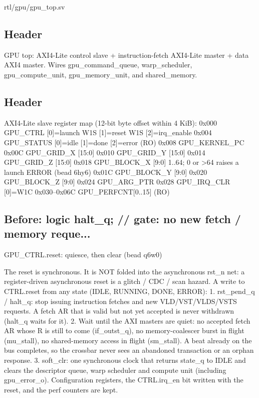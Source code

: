 \begin{relocated}{rtl/gpu/gpu_top.sv}

\subsection*{Header}

\begin{textblock}
GPU top: AXI4-Lite control slave + instruction-fetch AXI4-Lite master +
data AXI4 master.  Wires gpu_command_queue, warp_scheduler,
gpu_compute_unit, gpu_memory_unit, and shared_memory.
\end{textblock}

\subsection*{Header}

\begin{textblock}
AXI4-Lite slave register map (12-bit byte offset within 4 KiB):
  0x000 GPU_CTRL      [0]=launch W1S  [1]=reset W1S  [2]=irq_enable
  0x004 GPU_STATUS    [0]=idle [1]=done [2]=error  (RO)
  0x008 GPU_KERNEL_PC
  0x00C GPU_GRID_X    [15:0]
  0x010 GPU_GRID_Y    [15:0]
  0x014 GPU_GRID_Z    [15:0]
  0x018 GPU_BLOCK_X   [9:0]   1..64; 0 or >64 raises a launch ERROR (bead 6hy6)
  0x01C GPU_BLOCK_Y   [9:0]
  0x020 GPU_BLOCK_Z   [9:0]
  0x024 GPU_ARG_PTR
  0x028 GPU_IRQ_CLR   [0]=W1C
  0x030–0x06C GPU_PERFCNT[0..15]  (RO)
\end{textblock}

\subsection*{Before: logic halt\_q;       // gate: no new fetch / memory reque...}

\begin{textblock}
GPU_CTRL.reset: quiesce, then clear (bead q6w0)

The reset is synchronous.  It is NOT folded into the asynchronous rst_n
net: a register-driven asynchronous reset is a glitch / CDC / scan hazard.
A write to CTRL.reset from any state (IDLE, RUNNING, DONE, ERROR):
  1. rst_pend_q / halt_q: stop issuing instruction fetches and new
     VLD/VST/VLDS/VSTS requests.  A fetch AR that is valid but not yet
     accepted is never withdrawn (halt_q waits for it).
  2. Wait until the AXI masters are quiet: no accepted fetch AR whose R is
     still to come (if_outst_q), no memory-coalescer burst in flight
     (mu_stall), no shared-memory access in flight (sm_stall).  A beat
     already on the bus completes, so the crossbar never sees an
     abandoned transaction or an orphan response.
  3. soft_clr: one synchronous clock that returns state_q to IDLE and
     clears the descriptor queue, warp scheduler and compute unit
     (including gpu_error_o).  Configuration registers, the CTRL.irq_en
     bit written with the reset, and the perf counters are kept.


\end{textblock}
\end{relocated}
